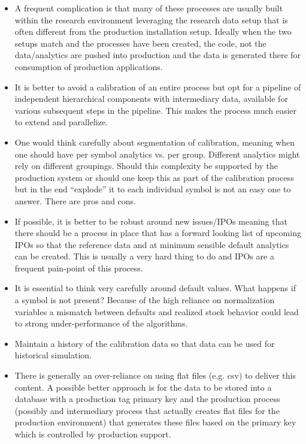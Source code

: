 \begin{itemize}
\item A frequent complication is that many of these processes are usually built within the research environment leveraging the research data setup that is often different from the production installation setup. Ideally when the two setups match and the processes have been created, the code, not the data/analytics are pushed into production and the data is generated there for consumption of production applications.

\item It is better to avoid a calibration of an entire process but opt for a pipeline of independent hierarchical components with intermediary data, available for various subsequent steps in the pipeline. This makes the process much easier to extend and parallelize. 

\item One would think carefully about segmentation of calibration, meaning when one should have per symbol analytics vs. per group. Different analytics might rely on different groupings. Should this complexity be supported by the production system or should one keep this as part of the calibration process but in the end ``explode'' it to each individual symbol is not an easy one to answer. There are pros and cons.

\item If possible, it is better to be robust around new issues/IPOs meaning that there should be a process in place that has a forward looking list of upcoming IPOs so that the reference data and at minimum sensible default analytics can be created. This is usually a very hard thing to do and IPOs are a frequent pain-point of this process.

\item It is essential to think very carefully around default values. What happens if a symbol is not present? Because of the high reliance on normalization variables a mismatch between defaults and realized stock behavior could lead to strong under-performance of the algorithms.

\item Maintain a history of the calibration data so that data can be used for historical simulation.

\item There is generally an over-reliance on using flat files (e.g. csv) to deliver this content. A possible better approach is for the data to be stored into a database with a production tag primary key and the production process (possibly and intermediary process that actually creates flat files for the production environment) that generates these files based on the primary key which is controlled by production support. 
\end{itemize}



